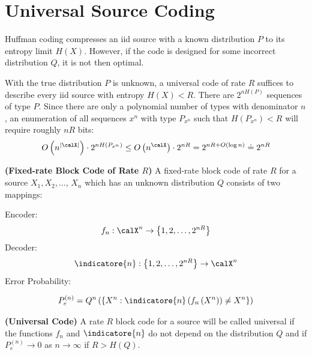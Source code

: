 \documentclass{article}
\newcommand{\bfs}[1]{\textbf{({#1})}}
\begin{document}
\section{Universal Source Coding}
Huffman coding compresses an \gls{iid} source with a known distribution $P$ to its entropy limit $H(X)$. However, if the code is designed for some incorrect distribution $Q$, it is not then optimal. 

With the true distribution $P$ is unknown,  a universal code of rate $R$  suffices to describe every \gls{iid} source with entropy $H(X)<R$. There are $2^{n H(P)}$ sequences of type $P$. Since there are only a polynomial number of types with denominator $n$, an enumeration of all sequences $x^{n}$ with type $P_{x^{n}}$ such that $H\left(P_{x^{n}}\right)<R$ will require roughly $n R$ bits:
$$O\left(n^{|\calX|}\right) \cdot 2^{nH\left(P_{x^{n}}\right)} \le O\left(n^{\calX}\right) \cdot 2^{n R} = 2^{n R+O(\log n)}\doteq 2^{n R}$$

\begin{defa}{\bfs{Fixed-rate Block Code of Rate $R$}}
A fixed-rate block code of rate $R$ for a source $X_{1}, X_{2}, \ldots$, $X_{n}$ which has an unknown distribution $Q$ consists of two mappings: 

Encoder:
\begin{align*}
f_{n}: \calX ^{n} \rightarrow\left\{1,2, \ldots, 2^{n R}\right\}
\end{align*}
Decoder:
    \begin{align*}
\indicatore{n}:\left\{1,2, \ldots, 2^{n R}\right\} \rightarrow \calX ^{n}
\end{align*}
Error Probability:
\end{defa}
    \begin{align*}
P_{e}^{(n)}=Q^{n}\left(\{X^{n}: \indicatore{n}\left(f_{n}\left(X^{n}\right)\right) \neq X^{n}\}\right)
\end{align*}

\begin{defa}{\bfs{Universal Code}}
A rate $R$ block code for a source will be called universal if the functions $f_{n}$ and $\indicatore{n}$ do not depend on the distribution $Q$ and if $P_{e}^{(n)} \rightarrow 0$ as $n \rightarrow \infty$ if $R>H(Q)$.
\end{defa} 
\end{document}
